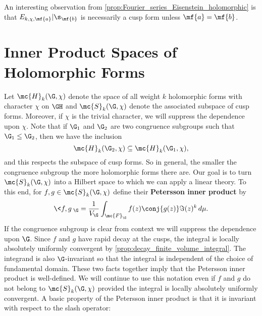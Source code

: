     An interesting observation from \cref{prop:Fourier_series_Eisenstein_holomorphic} is that $E_{k,\chi,\mf{a}}|\s_{\mf{b}}$ is necessarily a cusp form unless $\mf{a} = \mf{b}$.
  \section{Inner Product Spaces of Holomorphic Forms}
    Let $\mc{H}_{k}(\G,\chi)$ denote the space of all weight $k$ holomorphic forms with character $\chi$ on $\GH$ and $\mc{S}_{k}(\G,\chi)$ denote the associated subspace of cusp forms. Moreover, if $\chi$ is the trivial character, we will suppress the dependence upon $\chi$. Note that if $\G_{1}$ and $\G_{2}$ are two congruence subgroups such that $\G_{1} \le \G_{2}$, then we have the inclusion
    \[
      \mc{H}_{k}(\G_{2},\chi) \subseteq \mc{H}_{k}(\G_{1},\chi),
    \]
    and this respects the subspace of cusp forms. So in general, the smaller the congruence subgroup the more holomorphic forms there are. Our goal is to turn $\mc{S}_{k}(\G,\chi)$ into a Hilbert space to which we can apply a linear theory. To this end, for $f,g \in \mc{S}_{k}(\G,\chi)$ define their \textbf{Petersson inner product} by
    \[
      \<f,g\>_{\G} = \frac{1}{V_{\G}}\int_{\mc{F}_{\G}}f(z)\conj{g(z)}\Im(z)^{k}\,d\mu.
    \]
    If the congruence subgroup is clear from context we will suppress the dependence upon $\G$. Since $f$ and $g$ have rapid decay at the cusps, the integral is locally absolutely uniformly convergent by \cref{prop:decay_finite_volume_integral}. The integrand is also $\G$-invariant so that the integral is independent of the choice of fundamental domain. These two facts together imply that the Petersson inner product is well-defined. We will continue to use this notation even if $f$ and $g$ do not belong to $\mc{S}_{k}(\G,\chi)$ provided the integral is locally absolutely uniformly convergent. A basic property of the Petersson inner product is that it is invariant with respect to the slash operator:

